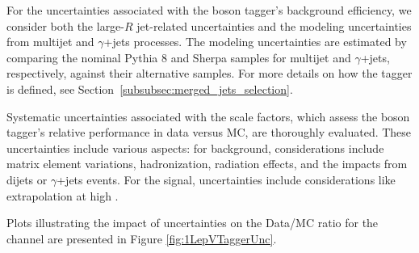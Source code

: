 \label{subsec:bkg_uncer_vtagger}
For the uncertainties associated with the boson tagger's background efficiency, we consider both the large-$R$ jet-related uncertainties and the modeling uncertainties from multijet and $\gamma$+jets processes. The modeling uncertainties are estimated by comparing the nominal Pythia 8 and Sherpa samples for multijet and $\gamma$+jets, respectively, against their alternative samples. For more details on how the tagger is defined, see Section~\ref{subsubsec:merged_jets_selection}.

Systematic uncertainties associated with the scale factors, which assess the boson tagger’s relative performance in data versus MC, are thoroughly evaluated. These uncertainties include various aspects: for background, considerations include matrix element variations, hadronization, radiation effects, and the impacts from dijets or $\gamma$+jets events. For the signal, uncertainties include considerations like extrapolation at high \pt.

Plots illustrating the impact of uncertainties on the Data/MC ratio for the \olep channel are presented in Figure \ref{fig:1LepVTaggerUnc}.

